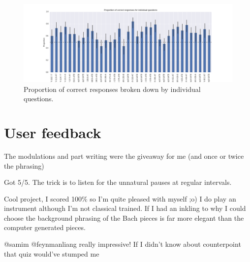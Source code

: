 \documentclass[dissertation.tex]{subfiles}
\begin{document}
\begin{figure}[htpb]
  \centering
  \includegraphics[width=1.0\linewidth]{Figures/responses-name.png}
  \caption{Proportion of correct responses broken down by individual questions.}
  \label{fig:responses-name}
\end{figure}


\section{User feedback}

The modulations and part writing were the giveaway for me (and once or twice the phrasing)

Got 5/5. The trick is to listen for the unnatural pauses at regular intervals.

Cool project, I scored 100\% so I'm quite pleased with myself ;o) I do
play an instrument although I'm not classical trained. If I had an
inkling to why I could choose the background phrasing of the Bach
pieces is far more elegant than the computer generated pieces.

@samim @feynmanliang really impressive! If I didn't know about counterpoint that quiz would've stumped me



\printbibliography
\end{document}
